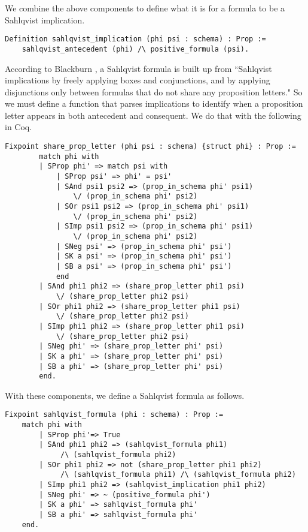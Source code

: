 We combine the above components to define what it is for a formula to be a Sahlqvist implication.

\begin{tcolorbox}
	\begin{lstlisting}[language=Coq]
Definition sahlqvist_implication (phi psi : schema) : Prop :=
	sahlqvist_antecedent (phi) /\ positive_formula (psi).

\end{lstlisting}
\end{tcolorbox}

According to Blackburn \etal\cite{modal}, a Sahlqvist formula is built up from ``Sahlqvist implications by freely applying boxes and conjunctions, and by applying disjunctions only between formulas that do not share any proposition letters." So we must define a function that parses implications to identify when a proposition letter appears in both antecedent and consequent. We do that with the following in Coq.

\begin{tcolorbox}
	\begin{lstlisting}[language=Coq]
	Fixpoint share_prop_letter (phi psi : schema) {struct phi} : Prop :=
		match phi with
		| SProp phi' => match psi with
			| SProp psi' => phi' = psi'
			| SAnd psi1 psi2 => (prop_in_schema phi' psi1)
			 	\/ (prop_in_schema phi' psi2)
			| SOr psi1 psi2 => (prop_in_schema phi' psi1) 
				\/ (prop_in_schema phi' psi2)
			| SImp psi1 psi2 => (prop_in_schema phi' psi1) 
				\/ (prop_in_schema phi' psi2)
			| SNeg psi' => (prop_in_schema phi' psi')
			| SK a psi' => (prop_in_schema phi' psi')
			| SB a psi' => (prop_in_schema phi' psi')
			end
		| SAnd phi1 phi2 => (share_prop_letter phi1 psi) 
			\/ (share_prop_letter phi2 psi)
		| SOr phi1 phi2 => (share_prop_letter phi1 psi) 
			\/ (share_prop_letter phi2 psi)
		| SImp phi1 phi2 => (share_prop_letter phi1 psi) 
			\/ (share_prop_letter phi2 psi)
		| SNeg phi' => (share_prop_letter phi' psi)
		| SK a phi' => (share_prop_letter phi' psi)
		| SB a phi' => (share_prop_letter phi' psi)
		end.
	\end{lstlisting}
\end{tcolorbox}


With these components, we define a Sahlqvist formula as follows.

\begin{tcolorbox}
	\begin{lstlisting}[language=Coq]
Fixpoint sahlqvist_formula (phi : schema) : Prop :=
	match phi with
		| SProp phi'=> True
		| SAnd phi1 phi2 => (sahlqvist_formula phi1)
			 /\ (sahlqvist_formula phi2)
		| SOr phi1 phi2 => not (share_prop_letter phi1 phi2)
			 /\ (sahlqvist_formula phi1) /\ (sahlqvist_formula phi2)
		| SImp phi1 phi2 => (sahlqvist_implication phi1 phi2)
		| SNeg phi' => ~ (positive_formula phi')
		| SK a phi' => sahlqvist_formula phi'
		| SB a phi' => sahlqvist_formula phi'
	end.
	\end{lstlisting}
\end{tcolorbox}
 
